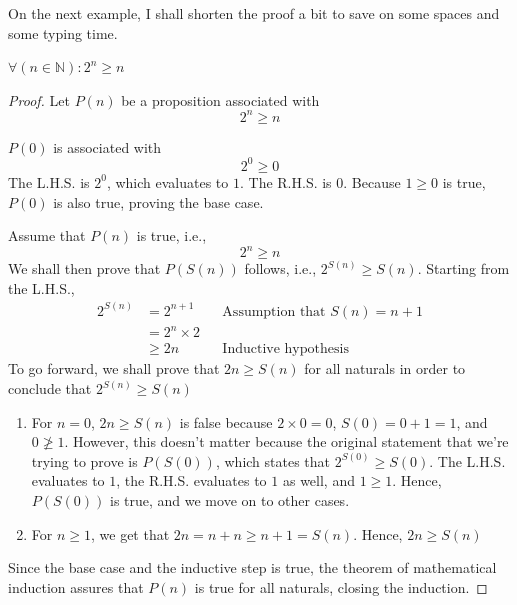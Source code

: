 On the next example, I shall shorten the proof a bit to save on some spaces and some typing time.

\begin{prop}{}{}
  \(\forall (n \in \mathbb{N}) : 2^n \geq n\)
\end{prop}

\begin{proof}
  Let \(P(n)\) be a proposition associated with
  \begin{equation*}
    2^n \geq n
  \end{equation*}

  \basecase \(P(0)\) is associated with
  \begin{equation}
    2^0 \geq 0
  \end{equation}
  The L.H.S. is \(2^0\), which evaluates to \(1\). The R.H.S. is \(0\). Because \(1 \geq 0\) is
  true, \(P(0)\) is also true, proving the base case.

  \inductivestep Assume that \(P(n)\) is true, i.e.,
  \begin{equation*}
    2^n \geq n
  \end{equation*}
  We shall then prove that \(P(S(n))\) follows, i.e., \(2^{S(n)} \geq S(n)\). Starting from the
  L.H.S.,
  \begin{align*}
    2^{S(n)} & = 2^{n+1}      &  & \textrm{Assumption that \(S(n) = n + 1\)} \\
             & = 2^n \times 2                                                \\
             & \geq 2n        &  & \textrm{Inductive hypothesis}
  \end{align*}
  To go forward, we shall prove that \(2n \geq S(n)\) for all naturals in order to conclude that
  \(2^{S(n)} \geq S(n)\)

  \begin{enumerate}
    \item For \(n = 0\), \(2n \geq S(n)\) is false because \(2 \times 0 = 0\), \(S(0) = 0 + 1 = 1\),
          and \(0 \not \geq 1\). However, this doesn't matter because the original statement that
          we're trying to prove is \(P(S(0))\), which states that \(2^{S(0)} \geq S(0)\). The L.H.S.
          evaluates to \(1\), the R.H.S. evaluates to \(1\) as well, and \(1 \geq 1\). Hence,
          \(P(S(0))\) is true, and we move on to other cases.
    \item For \(n \geq 1\), we get that \(2n = n + n \geq n + 1 = S(n)\). Hence, \(2n \geq S(n)\)
  \end{enumerate}

  Since the base case and the inductive step is true, the theorem of mathematical induction assures
  that \(P(n)\) is true for all naturals, closing the induction.
\end{proof}

